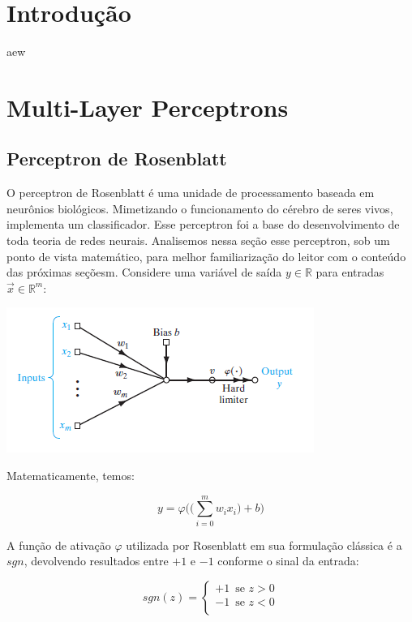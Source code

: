 \documentclass[
	12pt,				%
	oneside,			%
	a4paper,			%
	english,			%
	french,				%
	spanish,			%
	brazil,				%
	]{abntex2}
\begin{document}
\chapter[Introdução]{Introdução}
aew

\chapter{Multi-Layer Perceptrons}


\section{Perceptron de Rosenblatt}
O perceptron de Rosenblatt é uma unidade de processamento baseada em neurônios biológicos. Mimetizando o funcionamento do cérebro de seres vivos, implementa um classificador. Esse perceptron foi a base do desenvolvimento de toda teoria de redes neurais. Analisemos nessa seção esse perceptron, sob um ponto de vista matemático, para melhor familiarização do leitor com o conteúdo das próximas seçõesm. Considere uma variável de saída $y \in \mathbb{R}$ para entradas $\vec{x} \in \mathbb{R}^m$:

\begin{center}
	\includegraphics[scale=1]{rosenblattperceptron.png}
\end{center} 

Matematicamente, temos:

$$ y = \varphi\bigg(  \big(\sum_{i=0}^m w_ix_i\big) + b \bigg)$$

A função de ativação $\varphi$ utilizada por Rosenblatt em sua formulação clássica é a $sgn$, devolvendo resultados entre $+1$ e $-1$ conforme o sinal da entrada:

$$sgn(z) = \begin{cases}
+1 \enspace \text{se } z > 0 \\
-1 \enspace \text{se } z < 0 \\
\end{cases}$$
\end{document}
